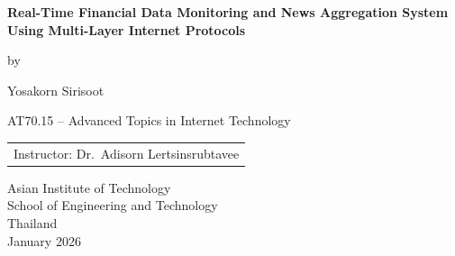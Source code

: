\setcounter{page}{1}
\thispagestyle{empty}

\vspace*{\fill}

\begin{center}
        {\Large \bfseries Real-Time Financial Data Monitoring and News Aggregation System Using Multi-Layer Internet Protocols\\}

    \vspace{9em}

    by

    \vspace{1.5em}

    \begin{center}
        Yosakorn Sirisoot  \\[0.5em]
    \end{center}

    \vspace{9em}

    \begin{center}AT70.15 -- Advanced Topics in Internet Technology\end{center}

    \vspace{3em}
    
    \begin{tabular}{l}
        Instructor: Dr.\ Adisorn Lertsinsrubtavee
    \end{tabular}

    \vspace{9em}

    Asian Institute of Technology\\
    School of Engineering and Technology\\
    Thailand\\
    January 2026
\end{center}




\vspace*{\fill}
